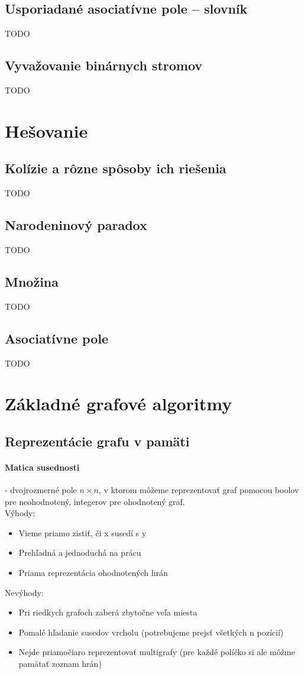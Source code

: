 	\subsection{Usporiadané asociatívne pole – slovník} TODO
	\subsection{Vyvažovanie binárnych stromov} TODO

\section{Hešovanie}

	\subsection{Kolízie a rôzne spôsoby ich riešenia} TODO
	\subsection{Narodeninový paradox} TODO
	\subsection{Množina} TODO
	\subsection{Asociatívne pole} TODO

\section{Základné grafové algoritmy}

	\subsection{Reprezentácie grafu v pamäti}

		\paragraph{Matica susednosti} - dvojrozmerné pole $n \times n$, v ktorom môžeme reprezentovať graf pomocou boolov pre neohodnotený, integerov pre ohodnotený graf. \\
		Výhody:
		\begin{itemize}
			\item Vieme priamo zistiť, či x susedí s y
			\item Prehľadná a jednoduchá na prácu
			\item Priama reprezentácia ohodnotených hrán
		\end{itemize}
		Nevýhody:
		\begin{itemize}
			\item Pri riedkych grafoch zaberá zbytočne veľa miesta
			\item Pomalé hľadanie susedov vrcholu (potrebujeme prejsť všetkých n pozícií)
			\item Nejde priamočiaro reprezentovať multigrafy (pre každé políčko si ale môžme pamätať zoznam hrán)
		\end{itemize}


